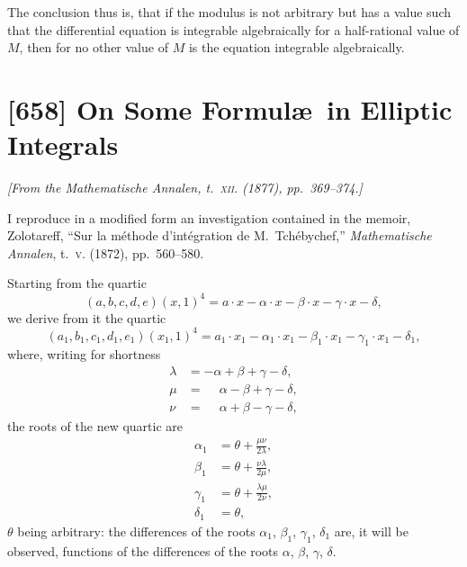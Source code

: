 \documentclass[11pt,a4paper]{book}
\begin{document}
The conclusion thus is, that if the modulus is not arbitrary but has a value such that the differential equation is integrable algebraically for a half-rational value of $M$, then for no other value of $M$ is the equation integrable algebraically.

\begin{flushright}
\end{flushright}

\newpage
\section{[658] On Some Formul\ae\ in Elliptic Integrals}
\label{sec:658}

\noindent\textit{[From the \emph{Mathematische Annalen}, t.~\textsc{xii}. (1877), pp.~369--374.]}

\medskip

I reproduce in a modified form an investigation contained in the memoir, Zolotareff, ``Sur la m\'ethode d'int\'egration de M.~Tch\'ebychef,'' \emph{Mathematische Annalen}, t.~\textsc{v}. (1872), pp.~560--580.

Starting from the quartic
\[
(a, b, c, d, e)(x, 1)^4 = a \cdot x - \alpha \cdot x - \beta \cdot x - \gamma \cdot x - \delta,
\]
we derive from it the quartic
\[
(a_1, b_1, c_1, d_1, e_1)(x_1, 1)^4 = a_1 \cdot x_1 - \alpha_1 \cdot x_1 - \beta_1 \cdot x_1 - \gamma_1 \cdot x_1 - \delta_1,
\]
where, writing for shortness
\begin{align*}
\lambda &= -\alpha + \beta + \gamma - \delta, \\
\mu &= \phantom{-}\alpha - \beta + \gamma - \delta, \\
\nu &= \phantom{-}\alpha + \beta - \gamma - \delta,
\end{align*}
the roots of the new quartic are
\begin{align*}
\alpha_1 &= \theta + \frac{\mu\nu}{2\lambda}, \\
\beta_1 &= \theta + \frac{\nu\lambda}{2\mu}, \\
\gamma_1 &= \theta + \frac{\lambda\mu}{2\nu}, \\
\delta_1 &= \theta,
\end{align*}
$\theta$ being arbitrary: the differences of the roots $\alpha_1$, $\beta_1$, $\gamma_1$, $\delta_1$ are, it will be observed, functions of the differences of the roots $\alpha$, $\beta$, $\gamma$, $\delta$.
\end{document}
